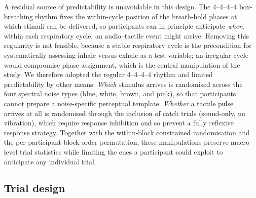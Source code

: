 A residual source of predictability is unavoidable in this design. The 4--4--4--4 box-breathing rhythm fixes the within-cycle position of the breath-hold phases at which stimuli can be delivered, so participants can in principle anticipate \emph{when}, within each respiratory cycle, an audio--tactile event might arrive. Removing this regularity is not feasible, because a stable respiratory cycle is the precondition for systematically assessing inhale versus exhale as a test variable; an irregular cycle would compromise phase assignment, which is the central manipulation of the study. We therefore adopted the regular 4--4--4--4 rhythm and limited predictability by other means. \emph{Which} stimulus arrives is randomised across the four spectral noise types (blue, white, brown, and pink), so that participants cannot prepare a noise-specific perceptual template. \emph{Whether} a tactile pulse arrives at all is randomised through the inclusion of catch trials (sound-only, no vibration), which require response inhibition and so prevent a fully reflexive response strategy. Together with the within-block constrained randomisation and the per-participant block-order permutation, these manipulations preserve macro-level trial statistics while limiting the cues a participant could exploit to anticipate any individual trial.

\subsection{Trial design}

